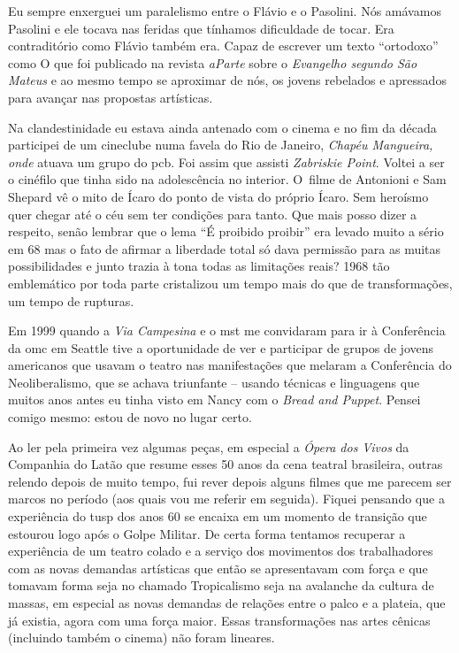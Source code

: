Eu sempre enxerguei um paralelismo entre o Flávio e o Pasolini. Nós
amávamos Pasolini e ele tocava nas feridas que tínhamos dificuldade de
tocar. Era contraditório como Flávio também era. Capaz de escrever um
texto “ortodoxo” como O que foi publicado na revista {\it aParte} sobre
o {\it Evangelho segundo São Mateus} e ao mesmo tempo se aproximar de
nós, os jovens rebelados e apressados para avançar nas propostas
artísticas.

Na clandestinidade eu estava ainda antenado com o cinema e no fim da
década participei de um cineclube numa favela do Rio de Janeiro,
{\it Chapéu Mangueira, onde} atuava um grupo do {\sc pcb}. Foi assim que
assisti {\it Zabriskie Point}. Voltei a ser o cinéfilo que tinha sido na
adolescência no interior. O~filme de Antonioni e Sam Shepard vê o mito
de Ícaro do ponto de vista do próprio Ícaro. Sem heroísmo quer chegar
até o céu sem ter condições para tanto. Que mais posso dizer a respeito,
senão lembrar que o lema “É proibido proibir” era levado muito a sério
em 68 mas o fato de afirmar a liberdade total só dava permissão para as
muitas possibilidades e junto trazia à tona todas as limitações reais?
1968 tão emblemático por toda parte cristalizou um tempo mais do que de
transformações, um tempo de rupturas.

Em 1999 quando a {\it Via Campesina} e o {\sc mst} me convidaram para ir
à Conferência da {\sc omc} em Seattle tive a oportunidade de ver e participar
de grupos de jovens americanos que usavam o teatro nas manifestações que
melaram a Conferência do Neoliberalismo, que se achava triunfante --
usando técnicas e linguagens que muitos anos antes eu tinha visto em
Nancy com o {\it Bread and Puppet}. Pensei comigo mesmo: estou de
novo no lugar certo.

\subject{***}

Ao ler pela primeira vez algumas peças, em especial a {\it Ópera dos
Vivos} da Companhia do Latão que resume esses 50 anos da cena teatral
brasileira, outras relendo depois de muito tempo, fui rever depois
alguns filmes que me parecem ser marcos no período (aos quais vou me
referir em seguida). Fiquei pensando que a experiência do {\sc tusp} dos anos
60 se encaixa em um momento de transição que estourou logo após o Golpe
Militar. De certa forma tentamos recuperar a experiência de um teatro
colado e a serviço dos movimentos dos trabalhadores com as novas
demandas artísticas que então se apresentavam com força e que tomavam
forma seja no chamado Tropicalismo seja na avalanche da cultura de
massas, em especial as novas demandas de relações entre o palco e a
plateia, que já existia, agora com uma força maior. Essas transformações
nas artes cênicas (incluindo também o cinema) não foram lineares.

